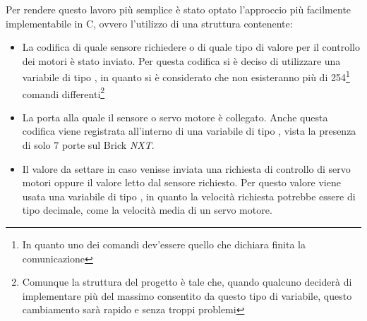 Per rendere questo lavoro più semplice è stato optato l'approccio più
facilmente implementabile in C, ovvero l'utilizzo di una struttura
contenente:
\label{sec:BROStruct}
\begin{itemize}
    \item La codifica di quale sensore richiedere o di quale tipo di valore
        per il controllo dei motori è stato inviato. Per questa codifica si
        è deciso di utilizzare una variabile di tipo ,
        in quanto si è considerato che non esisteranno più di
        254\footnote{In quanto uno dei comandi dev'essere quello che
        dichiara finita la comunicazione} comandi
        differenti\footnote{Comunque la struttura del progetto è tale che,
        quando qualcuno deciderà di implementare più del massimo consentito
        da questo tipo di variabile, questo cambiamento sarà rapido e senza
        troppi problemi}
    \item La porta alla quale il sensore o servo motore è collegato. Anche
        questa codifica viene registrata all'interno di una variabile di
        tipo , vista la presenza di solo $7$ porte sul
        Brick \emph{NXT}.
    \item Il valore da settare in caso venisse inviata una richiesta di
        controllo di servo motori oppure il valore letto dal sensore
        richiesto. Per questo valore viene usata una variabile di tipo
        , in quanto la velocità richiesta potrebbe essere
        di tipo decimale, come la velocità media di un servo motore.
\end{itemize}

